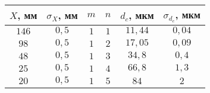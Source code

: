 \begin{tabular}{| c | c | c | c | c | c |}
\hline
$X$, мм & $\sigma_X$, мм & $m$ & $n$ & $d_c$, мкм & $\sigma_{d_c}$, мкм\\
\hline
$146$ & $0,5$ & $1$ & $1$ & $11,44$ & $0,04$\\
\hline
$98$ & $0,5$ & $1$ & $2$ & $17,05$ & $0,09$\\
\hline
$48$ & $0,5$ & $1$ & $3$ & $34,8$ & $0,4$\\
\hline
$25$ & $0,5$ & $1$ & $4$ & $66,8$ & $1,3$\\
\hline
$20$ & $0,5$ & $1$ & $5$ & $84$ & $2$\\
\hline
\end{tabular}
